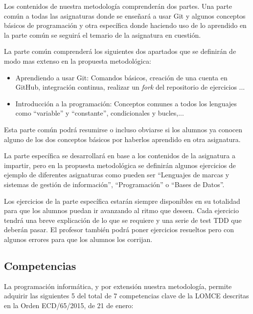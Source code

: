 Los contenidos de nuestra metodología comprenderán dos partes. Una parte común a todas las asignaturas donde se enseñará a usar Git y algunos conceptos básicos de programación y otra específica donde haciendo uso de lo aprendido en la parte común se seguirá el temario de la asignatura en cuestión.


\bigskip
La parte común comprenderá los siguientes dos apartados que se definirán de modo mas extenso en la propuesta metodológica:

\begin{itemize}
    \item Aprendiendo a usar Git: Comandos básicos, creación de una cuenta en GitHub, integración continua, realizar un \textit{fork} del repositorio de ejercicios ...
    \item Introducción a la programación: Conceptos comunes a todos los lenguajes como ``variable'' y ``constante'', condicionales y bucles,...
\end{itemize}

Esta parte común podrá resumirse o incluso obviarse si los alumnos ya conocen alguno de los dos conceptos básicos por haberlos aprendido en otra asignatura.

\bigskip
La parte específica se desarrollará en base a los contenidos de la asignatura a impartir, pero en la propuesta metodológica se definirán algunos ejercicios de ejemplo de diferentes asignaturas como pueden ser ``Lenguajes de marcas y sistemas de gestión de información'', ``Programación'' o ``Bases de Datos''.

\bigskip
Los ejercicios de la parte específica estarán siempre disponibles en su totalidad para que los alumnos puedan ir avanzando al ritmo que deseen. Cada ejercicio tendrá una breve explicación de lo que se requiere y una serie de test TDD que deberán pasar. El profesor también podrá poner ejercicios resueltos pero con algunos errores para que los alumnos los corrijan.

\subsection{Competencias}

La programación informática, y por extensión nuestra metodología, permite adquirir las siguientes 5 del total de 7 competencias clave de la LOMCE descritas en la Orden ECD/65/2015, de 21 de enero:

